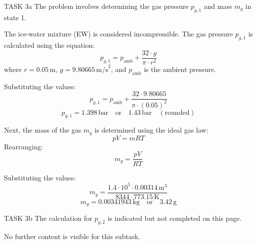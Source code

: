TASK 3a  
The problem involves determining the gas pressure \( p_{g,1} \) and mass \( m_g \) in state 1.  

The ice-water mixture (EW) is considered incompressible. The gas pressure \( p_{g,1} \) is calculated using the equation:  
\[
p_{g,1} = p_{\text{amb}} + \frac{32 \cdot g}{\pi \cdot r^2}
\]  
where \( r = 0.05 \, \text{m} \), \( g = 9.80665 \, \text{m/s}^2 \), and \( p_{\text{amb}} \) is the ambient pressure.  

Substituting the values:  
\[
p_{g,1} = p_{\text{amb}} + \frac{32 \cdot 9.80665}{\pi \cdot (0.05)^2}
\]  
\[
p_{g,1} = 1.398 \, \text{bar} \quad \text{or} \quad 1.43 \, \text{bar} \quad (\text{rounded})
\]  

Next, the mass of the gas \( m_g \) is determined using the ideal gas law:  
\[
p V = m R T
\]  
Rearranging:  
\[
m_g = \frac{p V}{R T}
\]  

Substituting the values:  
\[
m_g = \frac{1.4 \cdot 10^5 \cdot 0.00314 \, \text{m}^3}{8344 \cdot 773.15 \, \text{K}}
\]  
\[
m_g = 0.00341943 \, \text{kg} \quad \text{or} \quad 3.42 \, \text{g}
\]  

TASK 3b  
The calculation for \( p_{g,2} \) is indicated but not completed on this page.  

No further content is visible for this subtask.